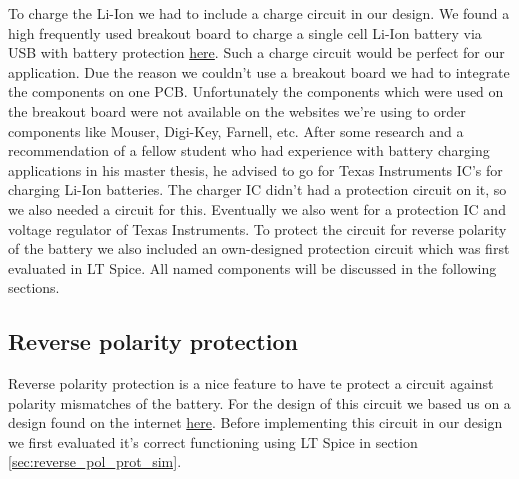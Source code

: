 \documentclass[11pt,a4paper]{article}
\begin{document}
To charge the Li-Ion we had to include a charge circuit in our design. We found a high frequently used breakout board to charge a single cell Li-Ion battery via USB with battery protection \href{http://acoptex.com/project/9446/basics-project-082a-lithum-battery-charger-tp4056-at-acoptexcom/#sthash.3qJ5RSCy.AsMaJFMH.dpbs}{here}. Such a charge circuit would be perfect for our application. Due the reason we couldn't use a breakout board we had to integrate the components on one PCB. Unfortunately the components which were used on the breakout board were not available on the websites we're using to order components like Mouser, Digi-Key, Farnell, etc. After some research and a recommendation of a fellow student who had experience with battery charging applications in his master thesis, he advised to go for Texas Instruments IC's for charging Li-Ion batteries. The charger IC didn't had a protection circuit on it, so we also needed a circuit for this. Eventually we also went for a protection IC and voltage regulator of Texas Instruments. To protect the circuit for reverse polarity of the battery we also included an own-designed protection circuit which was first evaluated in LT Spice. All named components will be discussed in the following sections.

\subsection{Reverse polarity protection}
Reverse polarity protection is a nice feature to have te protect a circuit against polarity mismatches of the battery. For the design of this circuit we based us on a design found on the internet \href{http://kaktuscircuits.blogspot.com/2014/07/reverse-polarity-and-overvoltage.html}{here}. Before implementing this circuit in our design we first evaluated it's correct functioning using LT Spice in section \ref{sec:reverse_pol_prot_sim}.
\end{document}

